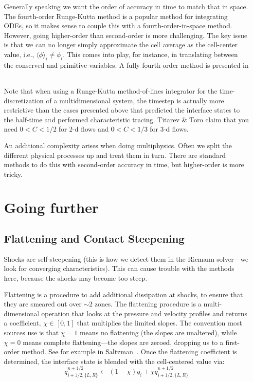 Generally speaking we want the order of accuracy in time to match that
in space.  The fourth-order Runge-Kutta method is a popular method for
integrating ODEs, so it makes sense to couple this with a
fourth-order-in-space method.  However, going higher-order than
second-order is more challenging.  The key issue is that we can no
longer simply approximate the cell average as the cell-center value,
i.e., $\langle \phi\rangle_i \ne \phi_i$.  This comes into play, for
instance, in translating between the conserved and primitive variables.
A fully fourth-order method is presented in ~\cite{mccorquodalecolella}

Note that when using a Runge-Kutta method-of-lines integrator for the
time-discretization of a multidimensional system, the timestep is
actually more restrictive than the cases presented above that
predicted the interface states to the half-time and performed
characteristic tracing.  Titarev \& Toro \cite{titarevtoro} claim that
you need $0 < C < 1/2$ for 2-d flows and $0 < C < 1/3$ for 3-d flows.

An additional complexity arises when doing multiphysics.  Often we
split the different physical processes up and treat them in turn.
There are standard methods to do this with second-order accuracy in time,
but higher-order is more tricky.






\section{Going further}

\label{sec:euler:further}

\subsection{Flattening and Contact Steepening}

  Shocks are self-steepening (this is how we
  detect them in the Riemann solver---we look for converging characteristics).
  This can cause trouble with the methods here, because the shocks may become
  too steep.

  Flattening is a procedure to add additional dissipation at shocks,
  to ensure that they are smeared out over $\sim 2$ zones.  The
  flattening procedure is a multi-dimensional operation that looks at
  the pressure and velocity profiles and returns a coefficient, $\chi
  \in [0,1]$ that multiplies the limited slopes.  The convention most
  sources use is that $\chi = 1$ means no flattening (the slopes are
  unaltered), while $\chi = 0$ means complete flattening---the slopes
  are zeroed, dropping us to a first-order method.
  See for example in Saltzman~\cite{saltzman:1994}.  Once the flattening
  coefficient is determined, the interface state is blended with the
  cell-centered value via:
  \begin{equation}
  q_{i+1/2,\{L,R\}}^{n+1/2} \leftarrow (1 - \chi) q_i + \chi q_{i+1/2,\{L,R\}}^{n+1/2}
  \end{equation}

